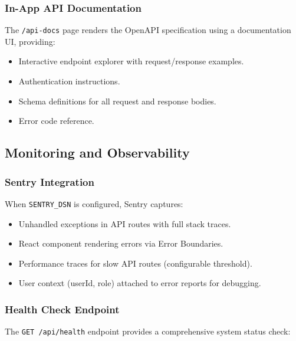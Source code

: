 \documentclass[12pt,onecolumn]{IEEEtran}
\begin{document}
\subsubsection{In-App API Documentation}

The \texttt{/api-docs} page renders the OpenAPI specification using a documentation UI, providing:
\begin{itemize}[leftmargin=1.5em]
  \item Interactive endpoint explorer with request/response examples.
  \item Authentication instructions.
  \item Schema definitions for all request and response bodies.
  \item Error code reference.
\end{itemize}

\subsection{Monitoring and Observability}

\subsubsection{Sentry Integration}

When \texttt{SENTRY\_DSN} is configured, Sentry captures:
\begin{itemize}[leftmargin=1.5em]
  \item Unhandled exceptions in API routes with full stack traces.
  \item React component rendering errors via Error Boundaries.
  \item Performance traces for slow API routes (configurable threshold).
  \item User context (userId, role) attached to error reports for debugging.
\end{itemize}

\subsubsection{Health Check Endpoint}

The \texttt{GET /api/health} endpoint provides a comprehensive system status check:
\end{document}

